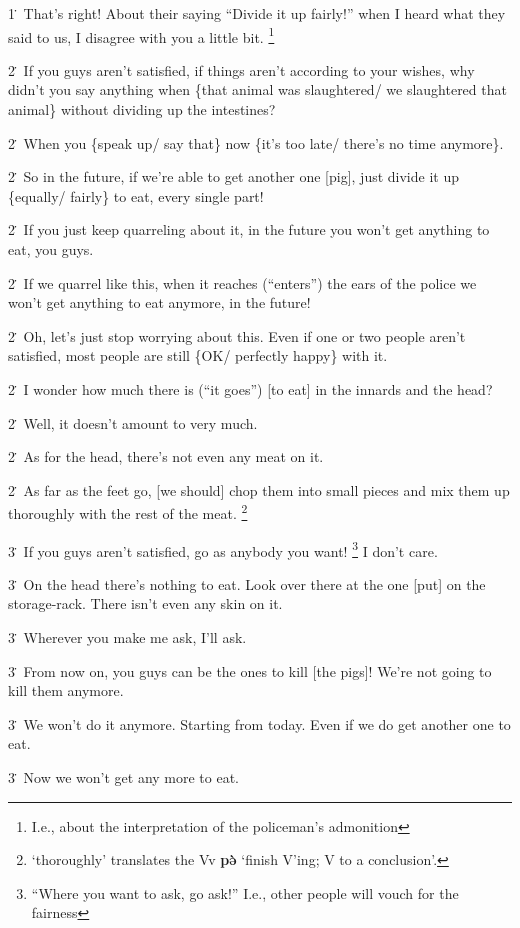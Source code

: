 {1\. That's right! About their saying ``Divide it up fairly!'' when I heard what
they said to us, I disagree with you a little bit. \footnote{I.e., about the interpretation of the policeman's admonition}

2\. If you guys aren't satisfied, if things aren't according to your wishes, why
didn't you say anything when \{that animal was slaughtered/ we slaughtered that
animal\} without dividing up the intestines?

2\. When you \{speak up/ say that\} now \{it's too late/ there's no time anymore\}.

2\. So in the future, if we're able to get another one [pig], just divide it up
\{equally/ fairly\} to eat, every single part!

2\. If you just keep quarreling about it, in the future you won't get anything
to eat, you guys.

2\. If we quarrel like this, when it reaches (``enters'') the ears of the police
we won't get anything to eat anymore, in the future!

2\. Oh, let's just stop worrying about this. Even if one or two people aren't satisfied,
most people are still \{OK/ perfectly happy\} with it.

2\. I wonder how much there is (``it goes'') [to eat] in the innards and the head?

2\. Well, it doesn't amount to very much.

2\. As for the head, there's not even any meat on it.

2\. As far as the feet go, [we should] chop them into small pieces and mix them
up thoroughly with the rest of the meat. \footnote{`thoroughly' translates the Vv \textbf{pə̀} `finish V'ing; V to a conclusion'.}

3\. If you guys aren't satisfied, go as anybody you want! \footnote{``Where you want to ask, go ask!'' I.e., other people will vouch for the fairness} I don't care.

3\. On the head there's nothing to eat. Look over there at the one [put] on the
storage-rack. There isn't even any skin on it.

3\. Wherever you make me ask, I'll ask.

3\. From now on, you guys can be the ones to kill [the pigs]! We're not going to
kill them anymore.

3\. We won't do it anymore. Starting from today. Even if we do get another one
to eat.

3\. Now we won't get any more to eat.

}
